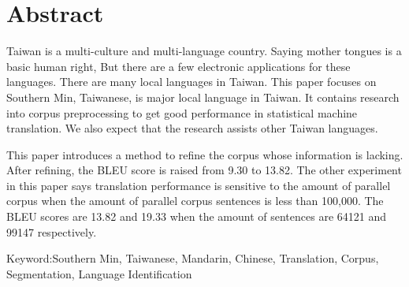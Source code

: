 \chapter{Abstract}
Taiwan is a multi-culture and multi-language country.
Saying mother tongues is a basic human right,
But there are a few electronic applications for these languages.
There are many local languages in Taiwan.
This paper focuses on Southern Min, Taiwanese, is major local language in Taiwan.
It contains research into corpus preprocessing to get good performance in statistical machine translation.
We also expect that the research assists other Taiwan languages.

This paper introduces a method to refine the corpus whose information is lacking.
After refining,
the BLEU score is raised from 9.30 to 13.82.
The other experiment in this paper says
translation performance is sensitive to the amount of parallel corpus
when the amount of parallel corpus sentences is less than 100,000.
The BLEU scores are 13.82 and 19.33 when the amount of sentences are 64121 and 99147 respectively.

Keyword:Southern Min, Taiwanese, Mandarin, Chinese, Translation, Corpus, Segmentation, Language Identification